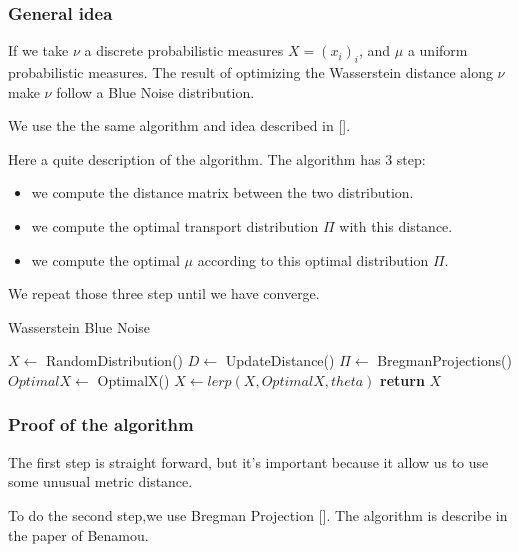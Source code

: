 \documentclass{classeENS}
\begin{document}
\subsubsection{General idea}

If we take $\nu$ a discrete probabilistic measures $X = (x_i)_i$, and $\mu$ a uniform probabilistic measures.
The result of optimizing the Wasserstein distance along $\nu$ make $\nu$ follow a Blue Noise 
distribution. 

We use the the same algorithm and idea described in [\cite{BlueNoiseWassertein}]. 

Here a quite description of the algorithm.
The algorithm has 3 step:
\begin{itemize}
    \item we compute the distance matrix between the two distribution.
    \item we compute the optimal transport distribution $\Pi$ with this distance.
    \item we compute the optimal $\mu$ according to this optimal distribution $\Pi$.
\end{itemize}
We repeat those three step until we have converge.

\begin{algorithm}
    \caption{Wasserstein Blue Noise}
    \label{euclid}
    \begin{algorithmic}[1] %
            \State $X \gets$ RandomDistribution()
                \State $D \gets$ UpdateDistance()
                \State $\Pi \gets$ BregmanProjections()
                \State $OptimalX \gets $ OptimalX()
                \State $X \gets lerp(X,OptimalX,theta)$ 
            \EndWhile\label{euclidendwhile}
            \State \textbf{return} $X$
        \EndProcedure
    \end{algorithmic}
\end{algorithm}

\subsubsection{Proof of the algorithm}

The first step is straight forward, but it's important because it allow us to use 
some unusual metric distance.

To do the second step,we use Bregman Projection [\cite{BregmanProjection}]. The algorithm
is describe in the paper of Benamou.
\end{document}
